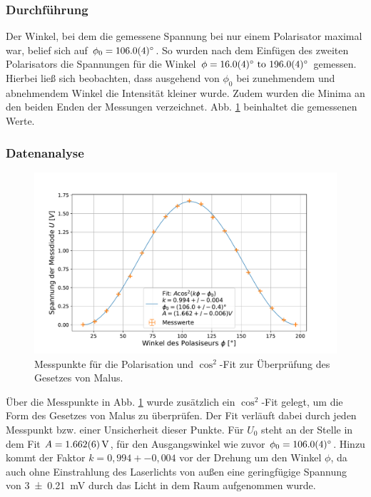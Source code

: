 		\subsubsection*{Durchführung}
		
			Der Winkel, bei dem die gemessene Spannung bei nur einem Polarisator maximal war, belief sich auf $\phi_0 = \SI{106+-0,4}{\degree}$.
			So wurden nach dem Einfügen des zweiten Polarisators die Spannungen für die Winkel $\phi = \SIrange{16+-0,4}{196+-0,4}{\degree}$ gemessen.
			Hierbei ließ sich beobachten, dass ausgehend von $\phi_0$ bei zunehmendem und abnehmendem Winkel die Intensität kleiner wurde.
			Zudem wurden die Minima an den beiden Enden der Messungen verzeichnet.
			Abb. \ref{fig:PolarisationFit} beinhaltet die gemessenen Werte.
		
		\subsubsection*{Datenanalyse}
			
			\begin{figure}[ht]
				\centering
				\includegraphics[width=\textwidth]{data/laserPolarisation.pdf}
				\caption{Messpunkte für die Polarisation und $\cos^2$-Fit zur Überprüfung des Gesetzes von Malus.}
				\label{fig:PolarisationFit}	
			\end{figure}
			Über die Messpunkte in Abb. \ref{fig:PolarisationFit} wurde zusätzlich ein $\cos^2$-Fit gelegt, um die Form des Gesetzes von Malus zu überprüfen.
			Der Fit verläuft dabei durch jeden Messpunkt bzw. einer Unsicherheit dieser Punkte.
			Für $U_0$ steht an der Stelle in dem Fit $A = \SI{1,662+-0,006}{\volt}$, für den Ausgangswinkel wie zuvor $\phi_0 = \SI{106+-0,4}{\degree}$.
			Hinzu kommt der Faktor $k=0,994+-0,004$ vor der Drehung um den Winkel $\phi$, da auch ohne Einstrahlung des Laserlichts von außen eine geringfügige Spannung von \SI{3+-0,21}{\milli\volt} durch das Licht in dem Raum aufgenommen wurde. %
		
